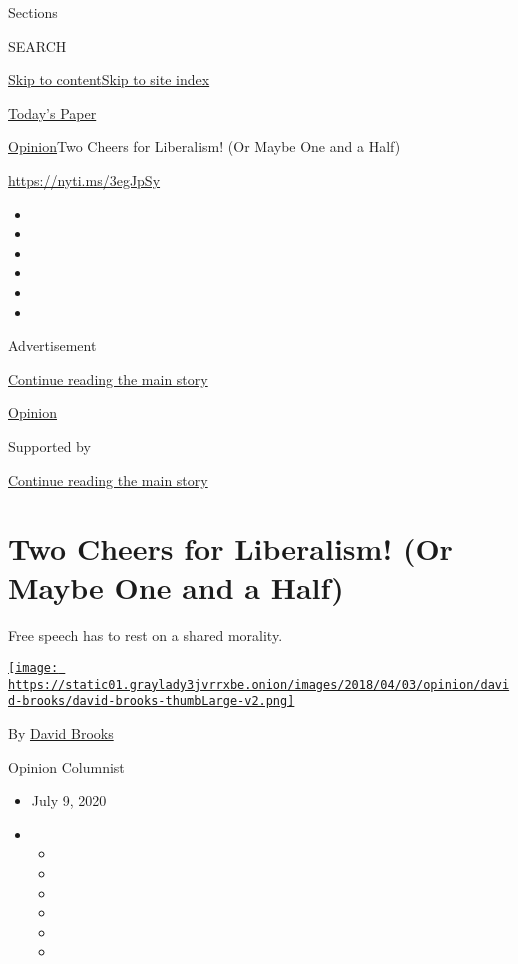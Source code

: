 Sections

SEARCH

\protect\hyperlink{site-content}{Skip to
content}\protect\hyperlink{site-index}{Skip to site index}

\href{https://myaccount.nytimes3xbfgragh.onion/auth/login?response_type=cookie\&client_id=vi}{}

\href{https://www.nytimes3xbfgragh.onion/section/todayspaper}{Today's
Paper}

\href{/section/opinion}{Opinion}\textbar{}Two Cheers for Liberalism! (Or
Maybe One and a Half)

\url{https://nyti.ms/3egJpSy}

\begin{itemize}
\item
\item
\item
\item
\item
\item
\end{itemize}

Advertisement

\protect\hyperlink{after-top}{Continue reading the main story}

\href{/section/opinion}{Opinion}

Supported by

\protect\hyperlink{after-sponsor}{Continue reading the main story}

\hypertarget{two-cheers-for-liberalism-or-maybe-one-and-a-half}{%
\section{Two Cheers for Liberalism! (Or Maybe One and a
Half)}\label{two-cheers-for-liberalism-or-maybe-one-and-a-half}}

Free speech has to rest on a shared morality.

\href{https://www.nytimes3xbfgragh.onion/by/david-brooks}{\texttt{[image: https://static01.graylady3jvrrxbe.onion/images/2018/04/03/opinion/david-brooks/david-brooks-thumbLarge-v2.png]}}

By \href{https://www.nytimes3xbfgragh.onion/by/david-brooks}{David
Brooks}

Opinion Columnist

\begin{itemize}
\item
  July 9, 2020
\item
  \begin{itemize}
  \item
  \item
  \item
  \item
  \item
  \item
  \end{itemize}
\end{itemize}

